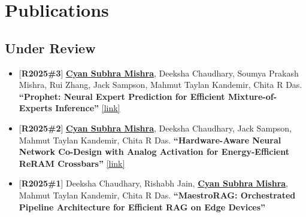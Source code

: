 \documentclass[letterpaper,11pt]{article}
\begin{document}

\section{Publications}

\subsection*{Under Review}
\begin{itemize}

\item \small{[\textbf{R2025\#3}] \textbf{\underline{Cyan Subhra Mishra}}, Deeksha Chaudhary, Soumya Prakash Mishra, Rui Zhang, Jack Sampson, Mahmut Taylan Kandemir, Chita R Das. \textbf{``Prophet: Neural Expert Prediction for Efficient Mixture-of-Experts Inference''} \href{https://drive.google.com/file/d/1n4RoKUPws2BikLI4gpDKDBD_a1vMhsiA/view?usp=sharing}{[link]} }

\item \small{[\textbf{R2025\#2}] \textbf{\underline{Cyan Subhra Mishra}}, Deeksha Chaudhary, Jack Sampson, Mahmut Taylan Kandemir, Chita R Das. \textbf{``Hardware-Aware Neural Network Co-Design with Analog Activation for Energy-Efficient ReRAM Crossbars''} \href{https://drive.google.com/file/d/13B_9yXeTTqPra8d2fy-NVZXISsMfp_PZ/view?usp=sharing}{[link]} }


\item \small{[\textbf{R2025\#1}] Deeksha Chaudhary, Rishabh Jain, \textbf{\underline{Cyan Subhra Mishra}}, Mahmut Taylan Kandemir, Chita R Das. \textbf{``MaestroRAG: Orchestrated Pipeline Architecture for Efficient RAG on Edge Devices''}}

\end{itemize}
\end{document}
